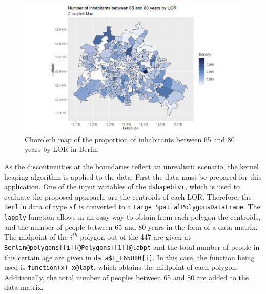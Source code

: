 
\begin{figure}[h]
    \centering
    \includegraphics[scale = 0.55]{Figure/Choropleth_Part1.png}
    \caption{Choroleth map of the proportion of inhabitants between 65 and 80 years by LOR in Berlin}
    \label{fig:NoByDistric}
\end{figure}

As the discontinuities at the boundaries reflect an unrealistic scenario, the kernel heaping algorithm is applied to the data. First the data must be prepared for this application.
One of the input variables of the \texttt{dshapebivr}, which is used to evaluate the proposed approach, are the centroids of each LOR. Therefore, the \texttt{Berlin} data of type \texttt{sf} is converted to a \texttt{Large SpatialPolygonsDataFrame}. 
The \texttt{lapply} function allows in an easy way to obtain from each polygon the centroids, and the number of people between 65 and 80 years in the form of a data matrix. 
The midpoint of the  $i^{th}$ polygon out of the 447 are given at \texttt{Berlin@polygons[[i]]@Polygons[[1]]@labpt} and the total number of people in this certain age are given in \texttt{data\$E\_E65U80[i]}.
In this case, the function being used is \texttt{function(x) x@lapt}, which obtains the midpoint of each polygon. Additionally, the total number of peoples between 65 and 80 are added to the data matrix. 

